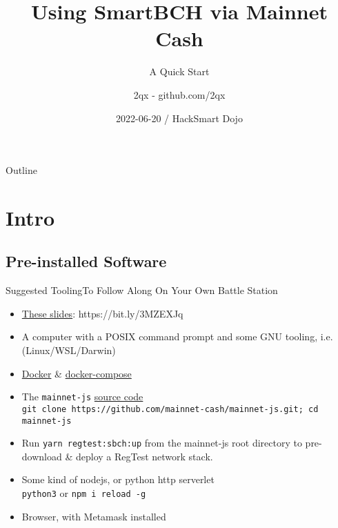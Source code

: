 \documentclass{beamer}
\title[smartBCH] %
{Using SmartBCH via Mainnet Cash}
\subtitle
{A Quick Start} %
\author[] %
{2qx - github.com/2qx}
\date[HackSmart] %
{2022-06-20 / HackSmart Dojo}
\begin{document}
\begin{frame}
  \titlepage
\end{frame}

\begin{frame}{Outline}
  \tableofcontents
\end{frame}




\section{Intro}

\subsection[What You Need]{Pre-installed Software}

\begin{frame}{Suggested Tooling}{To Follow Along On Your Own Battle Station}

  

  \begin{itemize}
    \item
    \href{https://raw.githubusercontent.com/2qx/mainnet-tutorial/main/slides/smarthBCH_quickstart.pdf}{These slides}: https://bit.ly/3MZEXJq
    \item
    A computer with a POSIX command prompt and some GNU tooling, i.e. (Linux/WSL/Darwin)
    \item   
    \href{https://docs.docker.com/get-docker/}{Docker} \& \href{https://docs.docker.com/compose/install/compose-desktop/}{docker-compose}
    \item
    The \texttt{mainnet-js} \href{https://github.com/mainnet-cash/mainnet-js/}{source code} \\
    \texttt{git clone https://github.com/mainnet-cash/mainnet-js.git; cd mainnet-js}
    \item
    Run \texttt{yarn regtest:sbch:up} from the mainnet-js root directory to pre-download \& deploy a RegTest network stack.
    \item
    Some kind of nodejs, or python http serverlet \\
    \texttt{python3} or \texttt{npm i reload -g}
  \item
    Browser, with Metamask installed
  \end{itemize}
\end{frame}
\end{document}
